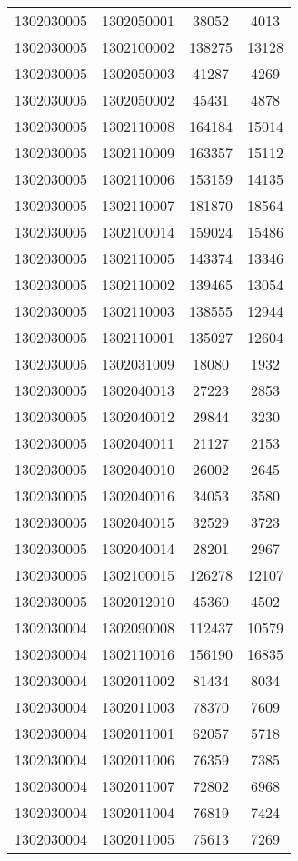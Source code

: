 \begin{longtable}{llcc}
1302030005 & 1302050001 & 38052 & 4013\\
1302030005 & 1302100002 & 138275 & 13128\\
1302030005 & 1302050003 & 41287 & 4269\\
1302030005 & 1302050002 & 45431 & 4878\\
1302030005 & 1302110008 & 164184 & 15014\\
1302030005 & 1302110009 & 163357 & 15112\\
1302030005 & 1302110006 & 153159 & 14135\\
1302030005 & 1302110007 & 181870 & 18564\\
1302030005 & 1302100014 & 159024 & 15486\\
1302030005 & 1302110005 & 143374 & 13346\\
1302030005 & 1302110002 & 139465 & 13054\\
1302030005 & 1302110003 & 138555 & 12944\\
1302030005 & 1302110001 & 135027 & 12604\\
1302030005 & 1302031009 & 18080 & 1932\\
1302030005 & 1302040013 & 27223 & 2853\\
1302030005 & 1302040012 & 29844 & 3230\\
1302030005 & 1302040011 & 21127 & 2153\\
1302030005 & 1302040010 & 26002 & 2645\\
1302030005 & 1302040016 & 34053 & 3580\\
1302030005 & 1302040015 & 32529 & 3723\\
1302030005 & 1302040014 & 28201 & 2967\\
1302030005 & 1302100015 & 126278 & 12107\\
1302030005 & 1302012010 & 45360 & 4502\\
1302030004 & 1302090008 & 112437 & 10579\\
1302030004 & 1302110016 & 156190 & 16835\\
1302030004 & 1302011002 & 81434 & 8034\\
1302030004 & 1302011003 & 78370 & 7609\\
1302030004 & 1302011001 & 62057 & 5718\\
1302030004 & 1302011006 & 76359 & 7385\\
1302030004 & 1302011007 & 72802 & 6968\\
1302030004 & 1302011004 & 76819 & 7424\\
1302030004 & 1302011005 & 75613 & 7269\\

\end{longtable}
